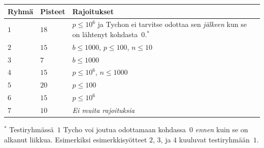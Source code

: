 \medskip
\begin{tabular}{lll}
Ryhmä & Pisteet & Rajoitukset \\\hline
  $1$ & $18$  & $p\leq 10^6$ 
  ja Tychon ei tarvitse odottaa sen \emph{jälkeen} kun se on lähtenyt kohdasta~$0$.$^*$ \\ %
  $2$ & $15$  & $b\leq 1000$, $p\leq 100$, $n\leq 10$ \\
  $3$ & $7$  & $b\leq 1000$ \\
  $4$ & $15$ & $p\leq 10^6$, $n\leq 1000$\\
  $5$ & $20$ & $p\leq 100$\\
  $6$ & $15$ & $p\leq 10^6$\\
  $7$ & $10$ & \emph{Ei muita rajoituksia}
\end{tabular}

\medskip
\noindent $^*$ Testiryhmässä~$1$ Tycho 
voi joutua odottamaan kohdassa~$0$ \emph{ennen} kuin se on alkanut liikkua.
Esimerkiksi e\-si\-merk\-ki\-syöt\-teet $2$, $3$, ja $4$ kuuluvat testiryhmään~$1$.
